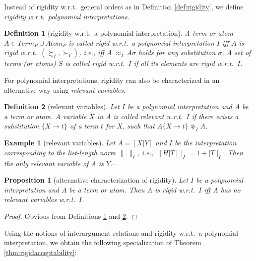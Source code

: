 \documentclass[envcountsame]{tlp}
\newcounter{ex:der-lastsymconsctr}
\newtheorem{definition}{Definition}
\newtheorem{example}{Example}
\newtheorem{proposition}{Proposition}
\begin{document}
Instead of rigidity w.r.t.\ general orders as in Definition
\ref{def:rigidity}, we define \emph{rigidity w.r.t.\ polynomial interpretations}.



\begin{definition}[rigidity w.r.t.\ a polynomial interpretation]
\label{def:rigidity-preinterpretation}
A term or atom $A \in \mathit{Term}_P \cup \mathit{Atom}_P$ is called
\emph{rigid w.r.t.\ a polynomial interpretation}
$I$ iff
$A$ is rigid w.r.t.\ $(\succsim_I,\succ_I)$, i.e., 
iff 
$A\; {\approx}_I \, A \sigma$ holds for any
substitution $\sigma$. A set of terms (or atoms) $S$ is called \emph{rigid}
w.r.t.\ $I$ if all its elements are rigid w.r.t.\ $I$.
\end{definition}



For polynomial interpretations, rigidity can also be characterized in an
alternative way using \emph{relevant variables}.



\begin{definition}[relevant variables]\label{def:relevantvar}
Let $I$ be a polynomial interpretation and $A$ be a term or
atom. A variable $X$ in
$A$ is called \emph{relevant} w.r.t.\ $I$ if there exists a substitution
$\{X \rightarrow t\}$ of a term $t$ for $X$,
such that
$A\{X \rightarrow t\}
\not\approx_I A$. 
\end{definition}


\begin{example}[relevant variables]
Let $A=[X|Y]$ and $\mathit{I}$ be the interpretation corresponding to the
list-length norm ${\parallel}.{\parallel}_\ell$,
i.e., ${\mid}[H|T]{\mid}_I= 1+{\mid}T{\mid}_I$. Then
the only relevant variable of $A$ is $Y$.{\hfill{$\square$}} 
\end{example}

\begin{proposition}[alternative characterization of rigidity]\label{prop:relevantvar}
Let $I$ be a polynomial interpretation and $A$ be a term or atom. 
Then $A$ is rigid w.r.t.\
$I$ iff $A$ has no relevant variables w.r.t.\ $I$.
\end{proposition}
\begin{proof}\label{proof:relevantvar}
Obvious from Definitions \ref{def:rigidity-preinterpretation} and  \ref{def:relevantvar}. 
\end{proof}



Using the notions of interargument relations and 
rigidity w.r.t.\ a
polynomial 
interpretation, we obtain the following specialization of Theorem
\ref{thm:rigidacceptability}: 
\end{document}
